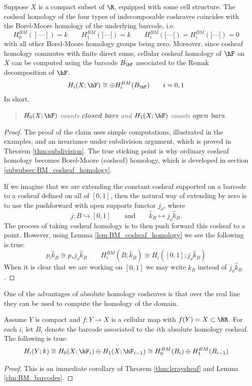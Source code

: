 \begin{lem}\label{clm:BM_barcodes}
	Suppose $X$ is a compact subset of $\R$, equipped with some cell structure. The cosheaf homology of the four types of indecomposable cosheaves coincides with the Borel-Moore homology of the underlying barcode, i.e.
	\[
		H_0^{BM}([\textrm{---}])=k \qquad H_1^{BM}(]\textrm{---}[)=k \qquad H_i^{BM}([\textrm{---}[)=H_i^{BM}(]\textrm{---}])=0
	\]
	with all other Borel-Moore homology groups being zero. Moreover, since cosheaf homology commutes with finite direct sums, cellular cosheaf homology of $\hF$ on $X$ can be computed using the barcode $B_{\hF}$ associated to the Remak decomposition of $\hF$.
	\[
		H_i(X;\hF)\cong \oplus H_i^{BM}(B_{\hF}) \qquad i=0,1
	\]
	In short,
	\begin{quote}
	\centering
	{\em $H_0(X;\hF)$ counts \textbf{closed bars} and $H_1(X;\hF)$ counts \textbf{open bars}.}
	\end{quote}
	
\end{lem}
\begin{proof}
The proof of the claim uses simple computations, illustrated in the examples, and an invariance under subdivision argument, which is proved in Theorem \ref{thm:subdivision}. The true sticking point is why ordinary cosheaf homology becomes Borel-Moore (cosheaf) homology, which is developed in section \ref{subsubsec:BM_cosheaf_homology}.

If we imagine that we are extending the constant cosheaf supported on a barcode to a cosheaf defined on all of $[0,1]$, then the natural way of extending by zero is to use the pushforward with open supports functor $j_{\dd}$, where
\[
	j: B \hookrightarrow [0,1] \qquad \mathrm{and} \qquad \hat{k}_B \mapsto j_{\dd}\hat{k}_B.
\]
The process of taking cosheaf homology is to then push forward this cosheaf to a point. However, using Lemma \ref{lem:BM_cosheaf_homology} we see the following is true: 
\[
	p_!\hat{k}_B \cong p_* j_{\dd}\hat{k}_B \qquad H^{BM}_i(B;\hat{k}_B)\cong H_i([0,1];j_{\dd}\hat{k}_B)
\]
When it is clear that we are working on $[0,1]$ we may write $\hat{k}_B$ instead of $j_{\dd}\hat{k}_B$.
\end{proof}

One of the advantages of absolute homology cosheaves is that over the real line they can be used to compute the homology of the domain.

\begin{cor}\label{cor:barcode_homology}
	Assume $Y$ is compact and $f:Y\to X$ is a cellular map with $f(Y)=X\subset\RR$. For each $i$, let $B_i$ denote the barcode associated to the $i$th absolute homology cosheaf. The following is true:
	 \[
	  H_i(Y;k)\cong H_0(X;\hF_i)\oplus H_1(X;\hF_{i-1}) \cong H_0^{BM}(B_i)\oplus H_1^{BM}(B_{i-1})
	 \]
\end{cor}
\begin{proof}
This is an immediate corollary of Theorem \ref{thm:leraysheaf} and Lemma \ref{clm:BM_barcodes}.
\end{proof}

